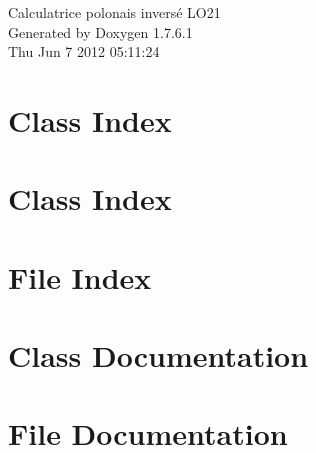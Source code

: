 \documentclass[a4paper]{book}
\begin{document}
\hypersetup{pageanchor=false,citecolor=blue}
\begin{titlepage}
\vspace*{7cm}
\begin{center}
{\Large \-Calculatrice polonais inversé \-L\-O21 }\\
\vspace*{1cm}
{\large \-Generated by Doxygen 1.7.6.1}\\
\vspace*{0.5cm}
{\small Thu Jun 7 2012 05:11:24}\\
\end{center}
\end{titlepage}
\clearemptydoublepage
{}
\tableofcontents
\clearemptydoublepage
{}
\hypersetup{pageanchor=true,citecolor=blue}
\chapter{\-Class \-Index}

\chapter{\-Class \-Index}

\chapter{\-File \-Index}

\chapter{\-Class \-Documentation}















\chapter{\-File \-Documentation}




\printindex
\end{document}
